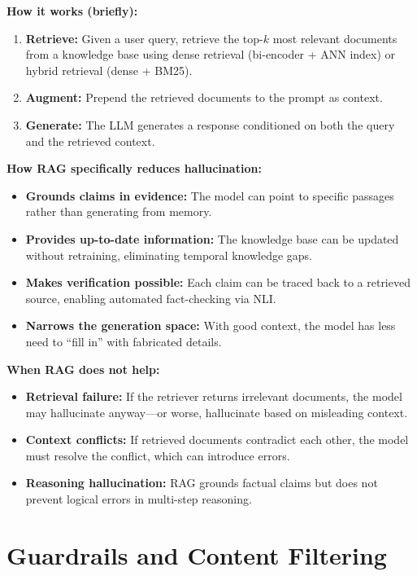\textbf{How it works (briefly):}
\begin{enumerate}
    \item \textbf{Retrieve:} Given a user query, retrieve the top-$k$ most relevant documents from a knowledge base using dense retrieval (bi-encoder + ANN index) or hybrid retrieval (dense + BM25).
    \item \textbf{Augment:} Prepend the retrieved documents to the prompt as context.
    \item \textbf{Generate:} The LLM generates a response conditioned on both the query and the retrieved context.
\end{enumerate}

\textbf{How RAG specifically reduces hallucination:}
\begin{itemize}
    \item \textbf{Grounds claims in evidence:} The model can point to specific passages rather than generating from memory.
    \item \textbf{Provides up-to-date information:} The knowledge base can be updated without retraining, eliminating temporal knowledge gaps.
    \item \textbf{Makes verification possible:} Each claim can be traced back to a retrieved source, enabling automated fact-checking via NLI.
    \item \textbf{Narrows the generation space:} With good context, the model has less need to ``fill in'' with fabricated details.
\end{itemize}

\textbf{When RAG does not help:}
\begin{itemize}
    \item \textbf{Retrieval failure:} If the retriever returns irrelevant documents, the model may hallucinate anyway---or worse, hallucinate based on misleading context.
    \item \textbf{Context conflicts:} If retrieved documents contradict each other, the model must resolve the conflict, which can introduce errors.
    \item \textbf{Reasoning hallucination:} RAG grounds factual claims but does not prevent logical errors in multi-step reasoning.
\end{itemize}

\section{Guardrails and Content Filtering}
\label{sec:guardrails}

